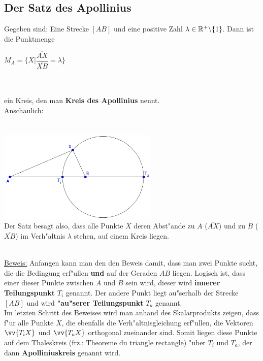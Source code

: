 \subsection{Der Satz des Apollinius}
\begin{small}

\begin{Definition}
Gegeben sind: Eine Strecke $[AB]$ und eine positive Zahl $\lambda \in \mathbb{R}^{+} \backslash \{1\}$. Dann ist die Punktmenge

\begin{center}
$M_{A}=\{X| \dfrac{\overline{AX}} {\overline{XB}}=\lambda \}$\\
\end{center}
\\
\\
ein Kreis, den man \textbf{Kreis des Apollinius} nennt.\\
Anschaulich:\\
\\
\\
\includegraphics[width=3in]{Apollinus_anschaulich}
\\
Der Satz besagt also, dass alle Punkte $X$ deren Abst"ande zu $A$ ($\overline{AX}$) und zu $B$ ($\overline{XB}$) im Verh"altnis $\lambda$ stehen, auf einem Kreis liegen.\\
\end{Definition}
\newline

\begin{Beweis}
\\
\underline{Beweis:}
Anfangen kann man den den Beweis damit, dass man zwei Punkte sucht, die die Bedingung erf"ullen \textbf{und} auf der Geraden $AB$ liegen. Logisch ist, dass einer dieser Punkte zwischen $A$ und $B$ sein wird, dieser wird \textbf{innerer Teilungspunkt} $T_{i}$ genannt. Der andere Punkt liegt au"serhalb der Strecke $[AB]$ und wird \textbf{"au"serer Teilungspunkt} $T_{a}$ genannt. \\
Im letzten Schritt des Beweises wird man anhand des Skalarprodukts zeigen, dass f"ur alle Punkte $X$, die ebenfalls die Verh"altnisgleichung erf"ullen, die Vektoren $\vv{T_{i}X}$ und $\vv{T_{a}X}$ orthogonal zueinander sind. Somit liegen diese Punkte auf dem Thaleskreis (frz.: Theoreme du triangle rectangle) "uber $T_{i}$ und $T_{a}$, der dann \textbf{Apolliniuskreis} genannt wird.\\
\begin{enumerate}



\end{enumerate}
\end{Beweis}
\end{small}
